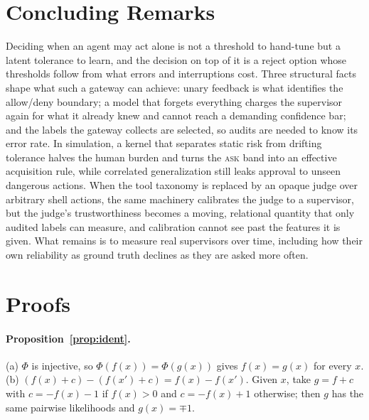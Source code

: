 \documentclass[11pt]{article}
\begin{document}
\section{Concluding Remarks}\label{sec:conclusion}

Deciding when an agent may act alone is not a threshold to hand-tune but a
latent tolerance to learn, and the decision on top of it is a reject option
whose thresholds follow from what errors and interruptions cost. Three
structural facts shape what such a gateway can achieve: unary feedback is what
identifies the allow/deny boundary; a model that forgets everything charges
the supervisor again for what it already knew and cannot reach a demanding
confidence bar; and the labels the gateway collects are selected, so audits
are needed to know its error rate. In simulation, a kernel that separates
static risk from drifting tolerance halves the human burden and turns the
\textsc{ask} band into an effective acquisition rule, while correlated
generalization still leaks approval to unseen dangerous actions. When the
tool taxonomy is replaced by an opaque judge over arbitrary shell actions, the
same machinery calibrates the judge to a supervisor, but the judge's
trustworthiness becomes a moving, relational quantity that only audited
labels can measure, and calibration cannot see past the features it is given.
What remains is to measure real supervisors over time, including how their
own reliability as ground truth declines as they are asked more often.




\appendix

\section{Proofs}\label{app:proofs}

\paragraph{Proposition~\ref{prop:ident}.} (a) $\Phi$ is injective, so
$\Phi(f(x)) = \Phi(g(x))$ gives $f(x) = g(x)$ for every $x$. (b)
$(f(x)+c) - (f(x')+c) = f(x) - f(x')$. Given $x$, take $g = f + c$ with
$c = -f(x) - 1$ if $f(x) > 0$ and $c = -f(x) + 1$ otherwise; then $g$ has the
same pairwise likelihoods and $g(x) = \mp 1$.
\end{document}

